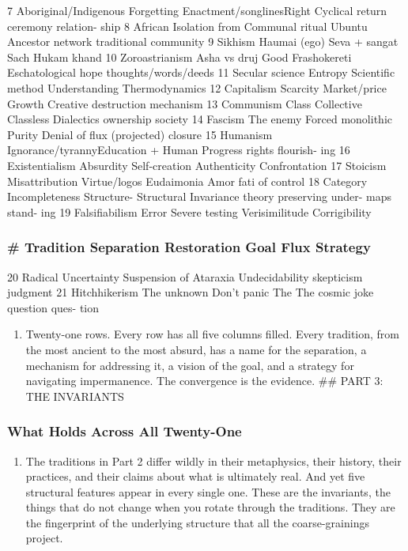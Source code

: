 \documentclass[
]{article}
\providecommand{\tightlist}{%
  \setlength{\itemsep}{0pt}\setlength{\parskip}{0pt}}
\begin{document}
7 Aboriginal/Indigenous Forgetting Enactment/songlinesRight Cyclical
return ceremony relation- ship 8 African Isolation from Communal ritual
Ubuntu Ancestor network traditional community 9 Sikhism Haumai (ego)
Seva + sangat Sach Hukam khand 10 Zoroastrianism Asha vs druj Good
Frashokereti Eschatological hope thoughts/words/deeds 11 Secular science
Entropy Scientific method Understanding Thermodynamics 12 Capitalism
Scarcity Market/price Growth Creative destruction mechanism 13 Communism
Class Collective Classless Dialectics ownership society 14 Fascism The
enemy Forced monolithic Purity Denial of flux (projected) closure 15
Humanism Ignorance/tyrannyEducation + Human Progress rights flourish-
ing 16 Existentialism Absurdity Self-creation Authenticity Confrontation
17 Stoicism Misattribution Virtue/logos Eudaimonia Amor fati of control
18 Category Incompleteness Structure- Structural Invariance theory
preserving under- maps stand- ing 19 Falsifiabilism Error Severe testing
Verisimilitude Corrigibility

\subsubsection{\# Tradition Separation Restoration Goal Flux
Strategy}\label{tradition-separation-restoration-goal-flux-strategy-2}

20 Radical Uncertainty Suspension of Ataraxia Undecidability skepticism
judgment 21 Hitchhikerism The unknown Don't panic The The cosmic joke
question ques- tion

\begin{enumerate}
\def\labelenumi{\arabic{enumi}.}
\setcounter{enumi}{160}
\tightlist
\item
  Twenty-one rows. Every row has all five columns filled. Every
  tradition, from the most ancient to the most absurd, has a name for
  the separation, a mechanism for addressing it, a vision of the goal,
  and a strategy for navigating impermanence. The convergence is the
  evidence. \#\# PART 3: THE INVARIANTS
\end{enumerate}

\subsubsection{What Holds Across All
Twenty-One}\label{what-holds-across-all-twenty-one}

\begin{enumerate}
\def\labelenumi{\arabic{enumi}.}
\setcounter{enumi}{161}
\tightlist
\item
  The traditions in Part 2 differ wildly in their metaphysics, their
  history, their practices, and their claims about what is ultimately
  real. And yet five structural features appear in every single one.
  These are the invariants, the things that do not change when you
  rotate through the traditions. They are the fingerprint of the
  underlying structure that all the coarse-grainings project.
\end{enumerate}
\end{document}
